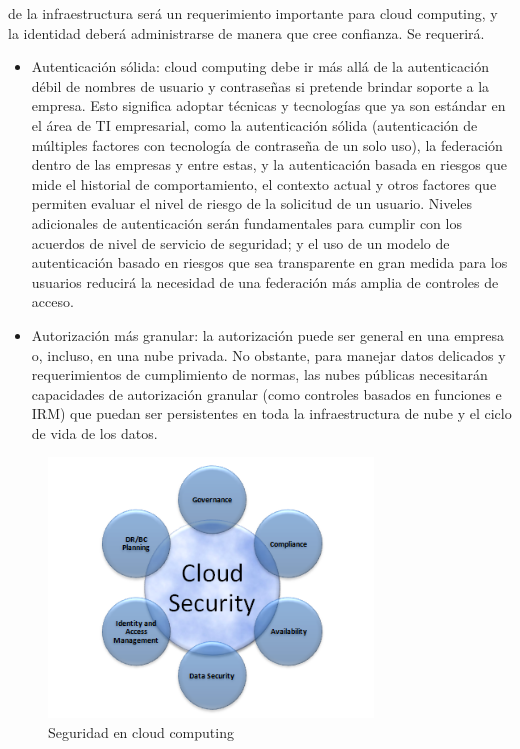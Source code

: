 \documentclass[12pt,a4paper]{article}
\begin{document}
de la infraestructura será un requerimiento importante para
cloud computing, y la identidad deberá administrarse de
manera que cree confianza. Se requerirá.
\begin{itemize}

\item Autenticación sólida: cloud computing debe ir más
allá de la autenticación débil de nombres de usuario y
contraseñas si pretende brindar soporte a la empresa.
Esto significa adoptar técnicas y tecnologías que ya
son estándar en el área de TI empresarial, como la
autenticación sólida (autenticación de múltiples
factores con tecnología de contraseña de un solo uso),
la federación dentro de las empresas y entre estas, y la
autenticación basada en riesgos que mide el historial de
comportamiento, el contexto actual y otros factores que
permiten evaluar el nivel de riesgo de la solicitud de un
usuario. Niveles adicionales de autenticación serán
fundamentales para cumplir con los acuerdos de nivel
de servicio de seguridad; y el uso de un modelo de
autenticación basado en riesgos que sea transparente
en gran medida para los usuarios reducirá la necesidad
de una federación más amplia de controles de acceso.

\item Autorización más granular: la autorización puede
ser general en una empresa o, incluso, en una nube
privada. No obstante, para manejar datos delicados y
requerimientos de cumplimiento de normas, las nubes
públicas necesitarán capacidades de autorización
granular (como controles basados en funciones e IRM)
que puedan ser persistentes en toda la infraestructura
de nube y el ciclo de vida de los datos.

\end{itemize}

\begin{figure}[h!]
 \centering
 \includegraphics[width=0.77\textwidth]{cloudsecurity1220.png}
\caption[Seguridad en Cloud]{Seguridad en cloud computing}
\end{figure}\par
\end{document}
